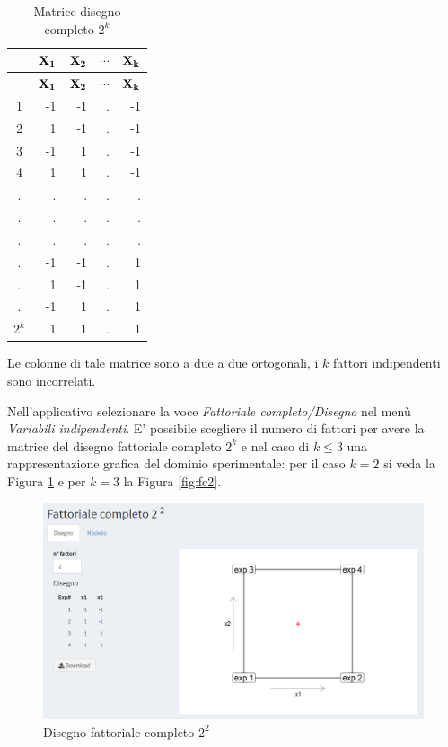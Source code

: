 \documentclass[
  11pt,
]{book}
\begin{document}
\begin{longtable}[]{@{}crrrr@{}}
\caption{\label{tab:MatrDisFull} Matrice disegno completo \(2^k\)}\tabularnewline
\toprule
& \(\bf{X_1}\) & \(\bf{X_2}\) & \(\cdots\) & \(\bf{X_k}\) \\
\midrule
\endfirsthead
\toprule
& \(\bf{X_1}\) & \(\bf{X_2}\) & \(\cdots\) & \(\bf{X_k}\) \\
\midrule
\endhead
1 & -1 & -1 & . & -1 \\
2 & 1 & -1 & . & -1 \\
3 & -1 & 1 & . & -1 \\
4 & 1 & 1 & . & -1 \\
. & . & . & . & . \\
. & . & . & . & . \\
. & . & . & . & . \\
. & -1 & -1 & . & 1 \\
. & 1 & -1 & . & 1 \\
. & -1 & 1 & . & 1 \\
\(2^k\) & 1 & 1 & . & 1 \\
\bottomrule
\end{longtable}

Le colonne di tale matrice sono a due a due ortogonali, i \(k\) fattori
indipendenti sono incorrelati.

Nell'applicativo selezionare la voce \emph{Fattoriale completo/Disegno} nel
menù \emph{Variabili indipendenti}. E' possibile scegliere il numero di
fattori per avere la matrice del disegno fattoriale completo \(2^k\) e nel
caso di \(k\leq 3\) una rappresentazione grafica del dominio sperimentale:
per il caso \(k=2\) si veda la Figura \ref{fig:fc1} e per \(k=3\) la
Figura \ref{fig:fc2}.

\begin{figure}

{\centering \includegraphics[width=1\linewidth]{Immagini/Fatt_compl/01_fattacompl2liv} 

}

\caption{Disegno fattoriale completo $2^2$}\label{fig:fc1}
\end{figure}
\end{document}
